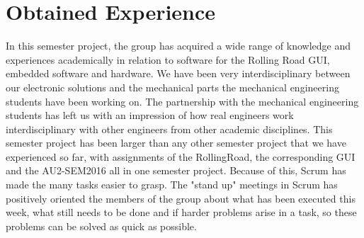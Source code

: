 \chapter{Obtained Experience}
In this semester project, the group has acquired a wide range of knowledge and experiences academically in relation to software for the Rolling Road GUI, embedded software and hardware. We have been very interdisciplinary between our electronic solutions and the mechanical parts the mechanical engineering students have been working on. The partnership with the mechanical engineering students has left us with an impression of how real engineers work interdisciplinary with other engineers from other academic disciplines. This semester project has been larger than any other semester project that we have experienced so far, with assignments of the RollingRoad, the corresponding GUI and the AU2-SEM2016 all in one semester project. Because of this, Scrum has made the many tasks easier to grasp. The "stand up" meetings in Scrum has positively oriented the members of the group about what has been executed this week, what still needs to be done and if harder problems arise in a task, so these problems can be solved as quick as possible.






